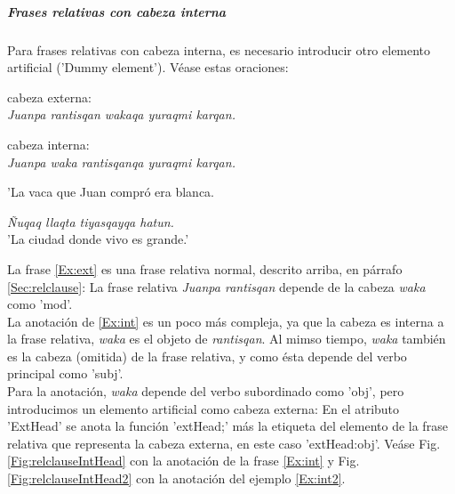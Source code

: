 \documentclass[a4paper,11pt,DIV12]{scrartcl}
\begin{document}
\subparagraph{Frases relativas con cabeza interna}

Para frases relativas con cabeza interna, es necesario introducir otro elemento artificial ('Dummy element'). V\'ease estas oraciones:

\begin{examples}
\item\label{Ex:ext} cabeza externa:\\
      {\em Juanpa rantisqan wakaqa yuraqmi karqan.}
\item\label{Ex:int} cabeza interna:\\
      {\em Juanpa waka rantisqanqa yuraqmi karqan.}
\item[] 'La vaca que Juan compr\'o era blanca.\\
 	\hfill{\small \citep[55]{Hastings04}}
\item\label{Ex:int2} {\em \~Nuqaq llaqta tiyasqayqa hatun.}\\
      'La ciudad donde vivo es grande.'\\
 	\hfill{\small \citep[55]{Hastings04}}
\end{examples}

La frase \ref{Ex:ext} es una frase relativa normal, descrito arriba, en p\'arrafo \ref{Sec:relclause}: La frase relativa {\em Juanpa rantisqan} depende de la cabeza {\em waka} como 'mod'. \\
La anotaci\'on de \ref{Ex:int} es un poco m\'as compleja, ya que la cabeza es interna a la frase relativa, {\em waka} es el objeto de {\em rantisqan}. Al mimso tiempo, {\em waka}  tambi\'en es la cabeza (omitida) de la frase relativa, y como \'esta depende del verbo principal como 'subj'. \\
Para la anotaci\'on, {\em waka} depende del verbo subordinado como 'obj', pero introducimos un elemento artificial como cabeza externa: En el atributo 'ExtHead' se anota la funci\'on 'extHead;' m\'as la etiqueta del elemento de la frase relativa que representa la cabeza externa, en este caso 'extHead:obj'. Ve\'ase Fig. \ref{Fig:relclauseIntHead} con la anotaci\'on de la frase \ref{Ex:int} y Fig. \ref{Fig:relclauseIntHead2} con la anotaci\'on del ejemplo \ref{Ex:int2}.
\end{document}
